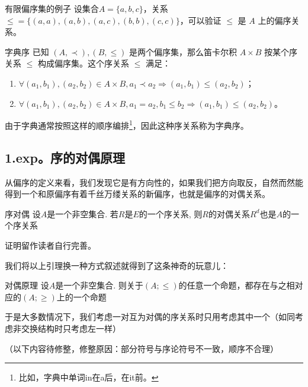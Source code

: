 \begin{example}{有限偏序集的例子}
设集合$A = \{a,b,c\}$，关系$\leq\!= \{(a,a),(a,b),(a,c),(b,b),(c,c)\}$，可以验证 $\leq$ 是 $A$ 上的偏序关系。
\end{example}

\begin{example}{字典序}\label{ex_OrdRel_1}
已知 $(A,\prec),(B,\leq)$ 是两个偏序集，那么笛卡尔积 $A\times B$ 按某个序关系 $\leqslant$ 构成偏序集。这个序关系 $\leqslant$ 满足：
\begin{enumerate}
\item $\forall(a_1,b_1),(a_2,b_2) \in A\times B, a_1\prec a_2 \Rightarrow (a_1,b_1)\leqslant(a_2,b_2)$；
\item $\forall(a_1,b_1),(a_2,b_2) \in A\times B, a_1=a_2, b_1\leq b_2 \Rightarrow (a_1,b_1) \leqslant (a_2, b_2)$。
\end{enumerate}

由于字典通常按照这样的顺序编排\footnote{比如，字典中单词in在a后，在it前。}，因此这种序关系称为字典序。
\end{example}

\begin{example}{小时百科文章序}
小时百科的\href{}{知识树可以看做一个偏序集，"文章预备知识"是这个偏序集的序关系，文章A在文章B前意味着文章A是文章B的预备知识
\end{example}

\subsection{1.exp。序的对偶原理}
从偏序的定义来看，我们发现它是有方向性的，如果我们把方向取反，自然而然能得到一个和原偏序有着千丝万缕关系的新偏序，也就是偏序的对偶关系。

\begin{lemma}{序对偶}
  设$A$是一个非空集合. 若$R$是$E$的一个序关系, 则$R$的对偶关系$R^{d}$也是$A$的一个序关系
\end{lemma}
证明留作读者自行完善。

我们将以上引理换一种方式叙述就得到了这条神奇的玩意儿：
\begin{theorem}{对偶原理}
 设$A$是一个非空集合. 则关于$(A;\leq)$的任意一个命题，都存在与之相对应的$(A;\geq)$上的一个命题
\end{theorem}

于是大多数情况下，我们考虑一对互为对偶的序关系时只用考虑其中一个（如同考虑非交换结构时只考虑左一样）

（以下内容待修整，修整原因：部分符号与序论符号不一致，顺序不合理）
